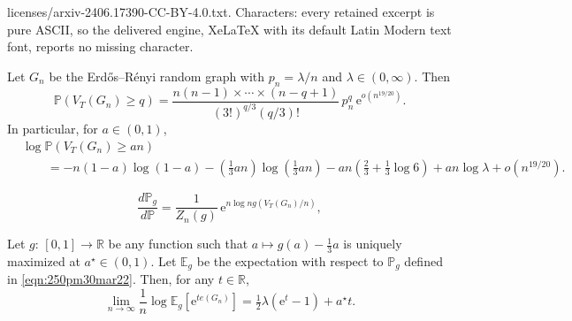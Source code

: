 \documentclass[10pt,a4paper]{amsart}
\newcommand{\erdos}{Erd\H{o}s--R\'enyi random graph}
\newcommand{\e}{{\mathrm e}}
\begin{document}
licenses/arxiv-2406.17390-CC-BY-4.0.txt. Characters: every retained excerpt is pure ASCII, so the delivered engine, XeLaTeX with its default Latin Modern text font, reports no missing character.
\begin{thm}
\label{thm:ldp_vertices_in_triangle}
Let $G_n$ be the \erdos{} with $p_n=\lambda/n$ and $\lambda \in (0,\infty)$. Then
	\begin{equation}
	\label{eqn:monfeb21426pm}
	\mathbb{P}(V_{T}(G_n)  \geq q) 
	= \frac{n(n-1) \times\cdots\times (n-q+1)} {(3!)^{q/3}(q/3)!}\, p_n^q\, \e^{o(n^{19/20})}.
	\end{equation}
In particular, for $a \in (0,1)$, 
	\begin{equation}
	\label{eqn:monfeb21427pm}
	\begin{aligned}
	&\log{\mathbb{P}(V_{T}(G_n)  \geq an)}\\ 
	&\qquad = -n(1-a) \log(1-a) - (\tfrac13 an) \log(\tfrac13 an) - an (\tfrac23  +\tfrac13 \log{6})
	+ an \log{\lambda} + o(n^{19/20}).
	\end{aligned}
	\end{equation}
\end{thm}

	\begin{equation}
	\label{eqn:250pm30mar22}
	\frac{d\mathbb{P}_g}{d\mathbb{P}} = \frac{1}{Z_n(g)}\, \mathrm{e}^{ n\log{n} g\left(V_{ T}(G_n)/n\right)},
	\end{equation}

\begin{lem}
\label{lem-edge-MGF-functional}
Let $g\colon\,[0,1]\rightarrow \mathbb{R}$ be any function such that $a\mapsto g(a)-\tfrac13 a$ is uniquely maximized at $a^\star \in (0,1)$. Let $\mathbb{E}_g$ be the expectation with respect to $\mathbb{P}_{g}$ defined in \eqref{eqn:250pm30mar22}. Then, for any $t \in \mathbb{R}$, 
	\begin{equation}
	\lim_{n\rightarrow \infty}\frac{1}{n}\log{\mathbb{E}_g\left[\e^{te(G_n)}\right]} = \tfrac{1}{2}\lambda (\e^t-1)+a^\star t.
	\end{equation}
\end{lem}
\end{document}
